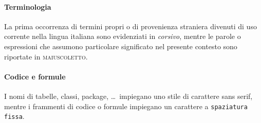 \paragraph{Terminologia} La prima occorrenza di termini propri o di provenienza straniera divenuti di uso corrente nella lingua italiana sono evidenziati in \textit{corsivo}, mentre le parole o espressioni che assumono particolare significato nel presente contesto sono riportate in \textsc{maiuscoletto}.

\paragraph{Codice e formule} I nomi di tabelle, classi, package, \ldots\ impiegano uno stile di carattere \textsf{sans serif}, mentre i frammenti di codice o formule impiegano un carattere a \texttt{spaziatura fissa}.
